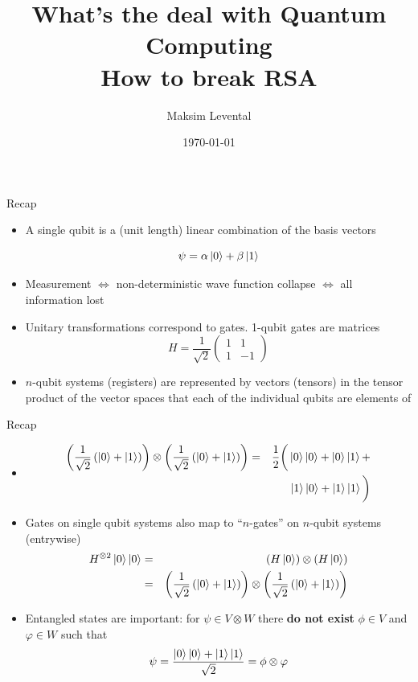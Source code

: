 \documentclass{beamer}
\title[What's the deal with QC]{What's the deal with Quantum Computing\\How to break RSA}
\author{Maksim Levental}
\date{\today}
\begin{document}

\begin{frame}
\titlepage
\end{frame}


\begin{frame}{Recap}
  
\begin{itemize}
     \item A single qubit is a (unit length) linear combination of the basis vectors 
  
       \[
       \psi=\alpha\Ket{0}+\beta\Ket{1}
       \] 
         
     \item Measurement $\iff$ non-deterministic wave function collapse $\iff$ all 
information lost
     \item Unitary transformations correspond to gates. 1-qubit gates are matrices 
       \[
       H=\frac{1}{\sqrt{2}}\begin{pmatrix}1 & 1\\
         1 & -1
       \end{pmatrix}
       \]

       \item $n$-qubit systems (registers) are represented by vectors (tensors) in the 
         tensor product of the vector spaces that each of the individual qubits are 
         elements of
\end{itemize}
\end{frame}

\begin{frame}{Recap}
\begin{itemize}
  \item[] 
    \begin{eqnarray*}
    \left(\frac{1}{\sqrt{2}}\left(\Ket{0}+\Ket{1}\right)\right)\otimes\left(\frac{1}{\sqrt{2}}\left(\Ket{0}+\Ket{1}\right)\right) &=&  \frac{1}{2}\bigg(\Ket{0}\Ket{0}+\Ket{0}\Ket{1}+\\
    &&\Ket{1}\Ket{0}+\Ket{1}\Ket{1}\bigg)
    \end{eqnarray*}
  \item Gates on single qubit systems also map to ``$n$-gates'' on $n$-qubit systems (entrywise)
    \begin{eqnarray*}
      H^{\otimes 2}\Ket{0}\Ket{0} & = & \left(H\Ket{0}\right)\otimes\left(H\Ket{0}\right)\\
                               & = & \left(\frac{1}{\sqrt{2}}\left(\Ket{0}+\Ket{1}\right)\right)\otimes\left(\frac{1}{\sqrt{2}}\left(\Ket{0}+\Ket{1}\right)\right)\\  
    \end{eqnarray*}
  \item Entangled states are important: for $\psi \in V\otimes W$ there \textbf{do not exist} $\phi \in V$ and $\varphi \in W$ such that
    \[
     \psi=\frac{\Ket{0}\Ket{0}+\Ket{1}\Ket{1}}{\sqrt{2}}=\phi\otimes\varphi
    \]
\end{itemize}
\end{frame}
\end{document}
